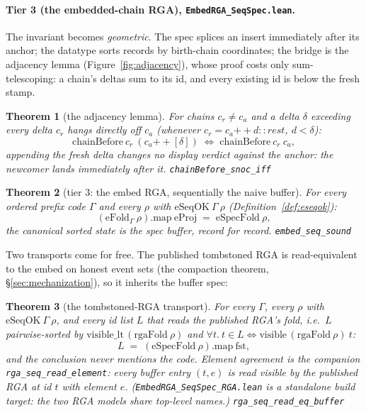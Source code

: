 \documentclass[11pt]{article}
\newtheorem{theorem}{Theorem}[section]
\newcommand{\lean}[1]{\texttt{#1}}
\newcommand{\code}[1]{\texttt{#1}}
\begin{document}
\paragraph{Tier 3 (the embedded-chain RGA),
\code{EmbedRGA\_SeqSpec.lean}.}
The invariant becomes \emph{geometric}. The spec splices an insert
immediately after its anchor; the datatype sorts records by
birth-chain coordinates; the bridge is the adjacency lemma
(Figure~\ref{fig:adjacency}), whose proof costs only sum-telescoping:
a chain's deltas sum to its id, and every existing id is below the
fresh stamp.

\begin{theorem}[the adjacency lemma]
\label{thm:adjacency}
For chains $c_r \ne c_a$ and a delta $\delta$ exceeding every delta
$c_r$ hangs directly off $c_a$ (whenever
$c_r = c_a \mathbin{+\!\!+} d :: \mathit{rest}$, $d < \delta$):
\[
  \mathrm{chainBefore}\ c_r\ (c_a \mathbin{+\!\!+} [\delta])
  \;\iff\; \mathrm{chainBefore}\ c_r\ c_a ,
\]
appending the fresh delta changes no display verdict against the
anchor: the newcomer lands immediately after it.
\hfill\lean{chainBefore\_snoc\_iff}
\end{theorem}

\begin{theorem}[tier 3: the embed RGA, sequentially the naive
buffer]
\label{thm:embedseq}
For every ordered prefix code $\Gamma$ and every $\rho$ with
$\mathrm{eSeqOK}\ \Gamma\ \rho$ (Definition~\ref{def:eseqok}):
\[
  (\mathrm{eFold}_\Gamma\ \rho).\mathrm{map}\ \mathrm{eProj}
  \;=\; \mathrm{eSpecFold}\ \rho ,
\]
the canonical sorted state \emph{is} the spec buffer, record for
record.
\hfill\lean{embed\_seq\_sound}
\end{theorem}

\noindent Two transports come for free. The published tombstoned RGA
is read-equivalent to the embed on honest event sets (the compaction
theorem, \S\ref{sec:mechanization}), so it inherits the buffer spec:

\begin{theorem}[the tombstoned-RGA transport]
\label{thm:rgaseqbuf}
For every $\Gamma$, every $\rho$ with $\mathrm{eSeqOK}\ \Gamma\ \rho$,
and every id list $L$ that reads the published RGA's fold, i.e.\
$L$ pairwise-sorted by
$\mathrm{visible\_lt}\,(\mathrm{rgaFold}\ \rho)$ and
$\forall t.\ t \in L \iff \mathrm{visible}\,(\mathrm{rgaFold}\
\rho)\ t$:
\[
  L \;=\; (\mathrm{eSpecFold}\ \rho).\mathrm{map}\ \mathrm{fst} ,
\]
and the conclusion never mentions the code. Element agreement is the
companion \lean{rga\_seq\_read\_element}: every buffer entry
$(t, e)$ is read visible by the published RGA at id $t$ with element
$e$. (\code{EmbedRGA\_SeqSpec\_RGA.lean} is a standalone build
target: the two RGA models share top-level names.)
\hfill\lean{rga\_seq\_read\_eq\_buffer}
\end{theorem}
\end{document}
